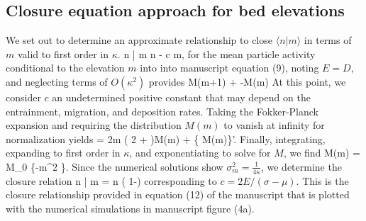 \subsection{Closure equation approach for bed elevations}
We set out to determine an approximate relationship to close $\langle n | m \rangle$ in terms of $m$ valid to first order in $\kappa$.
\be \langle n | m \rangle \approx \langle n \rangle  - \kappa c m,\ee
for the mean particle activity conditional to the elevation $m$ into into manuscript equation (9), noting $E=D$, and neglecting terms of $O(\kappa^2)$ provides 
 \approx {}M(m+1) + -M(m)
\ee
At this point, we consider $c$ an undetermined positive constant that may depend on the entrainment, migration, and deposition rates.
Taking the Fokker-Planck expansion and requiring the distribution $M(m)$ to vanish at infinity for normalization yields
 = 2\kappa m \Big( 2 + \Big)M(m) + \Big\{
M(m)\Big\}'.\ee
Finally, integrating, expanding to first order in $\kappa$, and exponentiating to solve for $M$, we find
\be M(m) = M_0 \exp\Big\{-\kappa m^2 \Big\}.\ee
Since the numerical solutions show $\sigma_m^2 = \frac{1}{4\kappa}$, we determine the closure relation
\be \langle n | m \rangle = \langle n \rangle\Big( 1-\Big) \ee
corresponding to $c=2E/(\sigma-\mu)$. This is the closure relationship provided in equation (12) of the manuscript that is plotted with the numerical simulations in manuscript figure (4a).